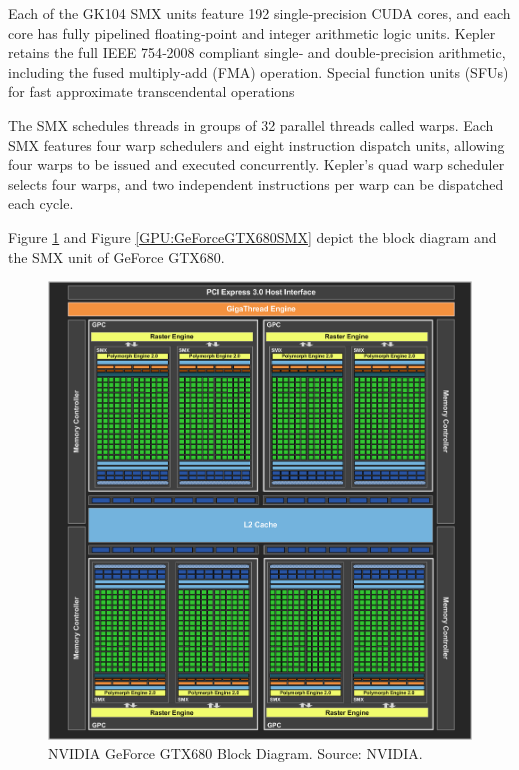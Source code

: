 Each of the GK104 SMX units feature 192 single‐precision CUDA cores, and each core has fully pipelined floating‐point and integer arithmetic logic units. Kepler retains the full IEEE 754‐2008 compliant single‐ and double‐precision arithmetic, including the fused multiply‐add (FMA) operation. Special function units (SFUs) for fast approximate transcendental operations

The SMX schedules threads in groups of 32 parallel threads called warps. Each SMX features four warp schedulers and eight instruction dispatch units, allowing four warps to be issued and executed concurrently. Kepler’s quad warp scheduler selects four warps, and two independent instructions per warp can be dispatched each cycle.

Figure \ref{GPU:GeForceGTX680BlockDiagram} and Figure \ref{GPU:GeForceGTX680SMX} depict the block diagram and the SMX unit of GeForce GTX680.

\begin{figure}
\centering
\includegraphics[width=\textwidth]{GPU/GeForceGTX680BlockDiagram.png}
\caption{NVIDIA GeForce GTX680 Block Diagram. Source: NVIDIA.}
\label{GPU:GeForceGTX680BlockDiagram}
\end{figure}

